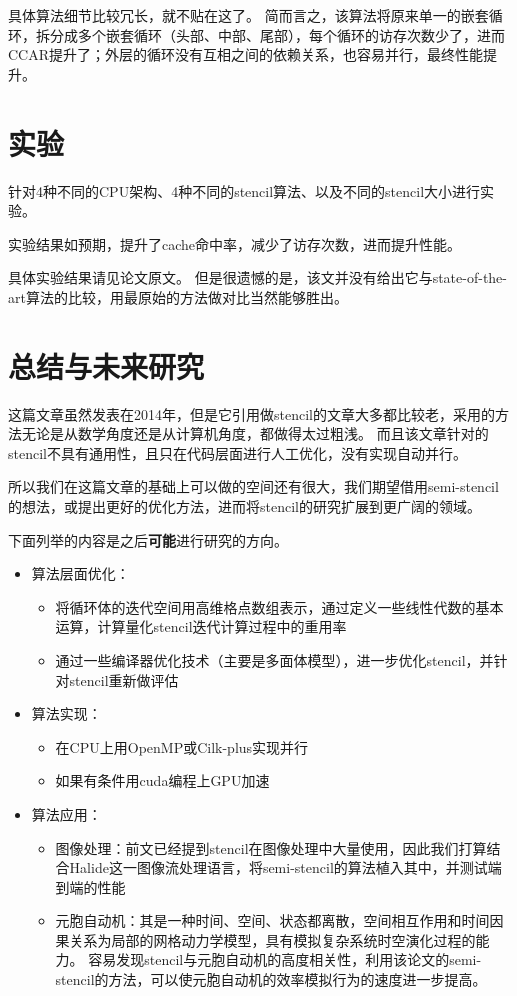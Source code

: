\documentclass[reportComp,bib]{thesis}
\begin{document}
具体算法细节比较冗长，就不贴在这了。
简而言之，该算法将原来单一的嵌套循环，拆分成多个嵌套循环（头部、中部、尾部），每个循环的访存次数少了，进而CCAR提升了；外层的循环没有互相之间的依赖关系，也容易并行，最终性能提升。

\section{实验}
针对4种不同的CPU架构、4种不同的stencil算法、以及不同的stencil大小进行实验。

实验结果如预期，提升了cache命中率，减少了访存次数，进而提升性能。

具体实验结果请见论文原文。
但是很遗憾的是，该文并没有给出它与state-of-the-art算法的比较，用最原始的方法做对比当然能够胜出。

\section{总结与未来研究}
这篇文章虽然发表在2014年，但是它引用做stencil的文章大多都比较老，采用的方法无论是从数学角度还是从计算机角度，都做得太过粗浅。
而且该文章针对的stencil不具有通用性，且只在代码层面进行人工优化，没有实现自动并行。

所以我们在这篇文章的基础上可以做的空间还有很大，我们期望借用semi-stencil的想法，或提出更好的优化方法，进而将stencil的研究扩展到更广阔的领域。

下面列举的内容是之后\textbf{可能}进行研究的方向。
\begin{itemize}
	\item 算法层面优化：
	\begin{itemize}
		\item 将循环体的迭代空间用高维格点数组表示\cite{pouchet:reuse_fpga_2013}，通过定义一些线性代数的基本运算，计算量化stencil迭代计算过程中的重用率
		\item 通过一些编译器优化技术（主要是多面体模型\cite{baghdadi:tiramisu_cgo_2019}），进一步优化stencil，并针对stencil重新做评估
	\end{itemize}
	\item 算法实现：
	\begin{itemize}
		\item 在CPU上用OpenMP或Cilk-plus\cite{cellular-automaton}实现并行
		\item 如果有条件用cuda编程上GPU加速
	\end{itemize}
	\item 算法应用：
	\begin{itemize}
		\item 图像处理：前文已经提到stencil在图像处理中大量使用，因此我们打算结合Halide\cite{ragan-kelley:pldi_halide_2013}这一图像流处理语言，将semi-stencil的算法植入其中，并测试端到端的性能
		\item 元胞自动机：其是一种时间、空间、状态都离散，空间相互作用和时间因果关系为局部的网格动力学模型，具有模拟复杂系统时空演化过程的能力。
		容易发现stencil与元胞自动机的高度相关性，利用该论文的semi-stencil的方法，可以使元胞自动机的效率模拟行为的速度进一步提高。
	\end{itemize}
\end{itemize}


\end{document}
